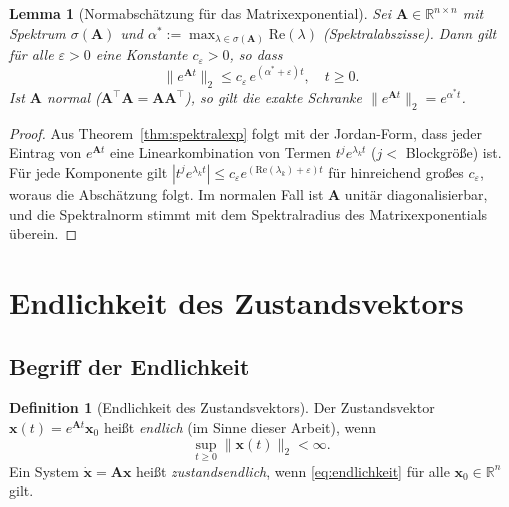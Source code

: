 \documentclass[a4paper, 12pt, twoside, openright]{report}
\newtheorem{lemma}[theorem]{Lemma}
\theoremstyle{definition}
\newtheorem{definition}[theorem]{Definition}
\theoremstyle{definition}
\newcommand{\R}{\mathbb{R}}
\newcommand{\vx}{\bm{x}}
\newcommand{\vA}{\bm{A}}
\newcommand{\T}{\top}
\newcommand{\spec}{\sigma}
\newcommand{\re}{\mathrm{Re}}
\begin{document}
\begin{lemma}[Normabschätzung für das Matrixexponential]
\label{lem:normbound}
Sei $\vA \in \R^{n \times n}$ mit Spektrum $\spec(\vA)$ und
$\alpha^* := \max_{\lambda \in \spec(\vA)} \re(\lambda)$ (Spektralabszisse).
Dann gilt für alle $\varepsilon > 0$ eine Konstante $c_\varepsilon > 0$, so dass
\begin{equation}
  \|e^{\vA t}\|_2 \leq c_\varepsilon\, e^{(\alpha^* + \varepsilon)t}, \quad t \geq 0.
  \label{eq:normbound}
\end{equation}
Ist $\vA$ normal ($\vA^\T\vA = \vA\vA^\T$), so gilt die exakte Schranke
$\|e^{\vA t}\|_2 = e^{\alpha^* t}$.
\end{lemma}

\begin{proof}
Aus Theorem~\ref{thm:spektralexp} folgt mit der Jordan-Form, dass jeder Eintrag von
$e^{\vA t}$ eine Linearkombination von Termen $t^j e^{\lambda_k t}$ ($j < $ Blockgröße)
ist. Für jede Komponente gilt $|t^j e^{\lambda_k t}| \leq c_\varepsilon e^{(\re(\lambda_k)+\varepsilon)t}$
für hinreichend großes $c_\varepsilon$, woraus die Abschätzung folgt. Im normalen Fall
ist $\vA$ unitär diagonalisierbar, und die Spektralnorm stimmt mit dem Spektralradius
des Matrixexponentials überein. \qedhere
\end{proof}

\section{Endlichkeit des Zustandsvektors}
\label{sec:endlichkeit}

\subsection{Begriff der Endlichkeit}

\begin{definition}[Endlichkeit des Zustandsvektors]
\label{def:endlichkeit}
Der Zustandsvektor $\vx(t) = e^{\vA t}\vx_0$ heißt \emph{endlich} (im Sinne dieser
Arbeit), wenn
\begin{equation}
  \sup_{t \geq 0} \|\vx(t)\|_2 < \infty.
  \label{eq:endlichkeit}
\end{equation}
Ein System $\dot{\vx} = \vA\vx$ heißt \emph{zustandsendlich}, wenn
\eqref{eq:endlichkeit} für alle $\vx_0 \in \R^n$ gilt.
\end{definition}
\end{document}
